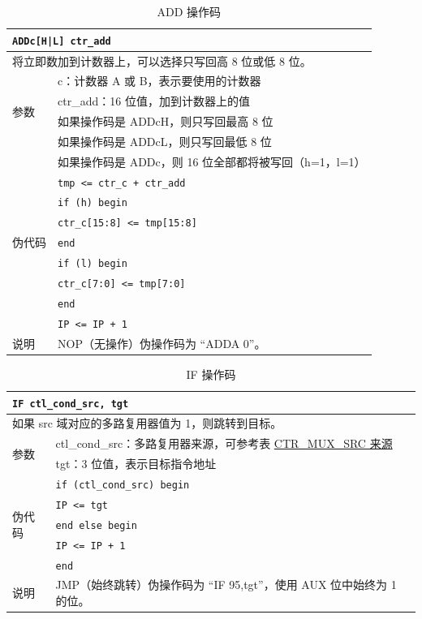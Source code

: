 \documentclass[main\_\_CN.tex]{subfiles}
\begin{document}
\begin{table}[H]
\caption{ADD 操作码}
\label{tab:bitscrm-add-opcode}
\begin{tabular}{|l|l|}
\hline
\multicolumn{2}{|l|}{\texttt{ADDc[H|L] ctr\_add}} \\
\hline
\multicolumn{2}{|L{17cm}|}{将立即数加到计数器上，可以选择只写回高 8 位或低 8 位。} \\
\hline
\multirow{4}{*}{参数} & c：计数器 A 或 B，表示要使用的计数器 \\
& ctr\_add：16 位值，加到计数器上的值 \\
& 如果操作码是 ADDcH，则只写回最高 8 位 \\
& 如果操作码是 ADDcL，则只写回最低 8 位 \\
& 如果操作码是 ADDc，则 16 位全部都将被写回（h=1，l=1）\\
\hline
\multirow{7}{*}{伪代码} & \texttt{tmp <= ctr\_c + ctr\_add} \\
& \texttt{if (h) begin} \\
& \hspace*{4mm} \texttt{ctr\_c[15:8] <= tmp[15:8]} \\
& \texttt{end} \\
& \texttt{if (l) begin} \\
& \hspace*{4mm} \texttt{ctr\_c[7:0] <= tmp[7:0]} \\
& \texttt{end} \\
& \texttt{IP <= IP + 1} \\
\hline
说明 & NOP（无操作）伪操作码为 ``ADDA 0”。\\
\hline
\end{tabular}
\end{table}

\begin{table}[H]
\caption{IF 操作码}
\label{tab:bitscrm-if-opcode}
\begin{tabular}{|l|p{14cm}|}
\hline
\multicolumn{2}{|l|}{\texttt{IF ctl\_cond\_src, tgt}} \\
\hline
\multicolumn{2}{|L{17cm}|}{如果 src 域对应的多路复用器值为 1，则跳转到目标。}\\
\hline
\multirow{2}{*}{参数} & ctl\_cond\_src：多路复用器来源，可参考表 \hyperref[tab:bitscrm-ctrmuxsrc]{CTR\_MUX\_SRC 来源} \\
& tgt：3 位值，表示目标指令地址  \\
\hline
\multirow{5}{*}{伪代码} & \texttt{if (ctl\_cond\_src) begin} \\
& \hspace*{4mm} \texttt{IP <= tgt} \\
& \texttt{end else begin} \\
& \hspace*{4mm} \texttt{IP <= IP + 1} \\
& \texttt{end} \\
\hline
说明 &  JMP（始终跳转）伪操作码为 ``IF 95,tgt”，使用 AUX 位中始终为 1 的位。\\
\hline
\end{tabular}
\end{table}
\end{document}
